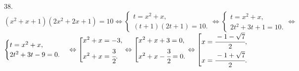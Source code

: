 38. $(x^2+x+1)(2x^2+2x+1)=10\Leftrightarrow \begin{cases}
t=x^2+x,\\
(t+1)(2t+1)=10.\end{cases}\Leftrightarrow \begin{cases}
t=x^2+x,\\
2t^2+3t+1=10.\end{cases}\Leftrightarrow$\\$ \begin{cases}
t=x^2+x,\\
2t^2+3t-9=0.\end{cases}\Leftrightarrow\left[
      \begin{gathered} x^2+x=-3,\hfill\\
      x^2+x=\cfrac{3}{2}.\hfill \end{gathered}\right.\Leftrightarrow\left[
      \begin{gathered} x^2+x+3=0,\hfill\\
      x^2+x-\cfrac{3}{2}=0.\hfill \end{gathered}\right.\Leftrightarrow\left[
      \begin{gathered} x=\cfrac{-1-\sqrt{7}}{2},\hfill\\
      x=\cfrac{-1+\sqrt{7}}{2}.\hfill \end{gathered}\right.$\\

